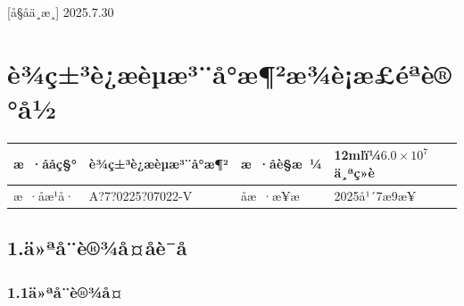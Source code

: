 \documentclass[UTF8,10pt,a4paper,fontset=fandol]{ctexart}
\newcommand{\fieldvalue}[1]{#1}
\newcommand{\handwritten}[1]{#1}
\begin{document}
\bigskip

\handwritten{[å§åä¸æ¸]}\quad
\handwritten{2025.7.30}

\newpage

\section*{è¾ç±³è¿æèµæ³¨å°æ¶²æ¾è¡æ£éªè®°å½}

\begin{tabularx}{\textwidth}{|l|X|l|X|}
\hline
æ ·ååç§° &
\fieldvalue{è¾ç±³è¿æèµæ³¨å°æ¶²} &
æ ·åè§æ ¼ &
\fieldvalue{12mlï¼$6.0\times10^{7}$ä¸ªç»è}
\\ \hline
æ ·åæ¹å· &
\fieldvalue{\handwritten{A?7?0225?07022-V}} &
åæ ·æ¥æ &
\fieldvalue{\handwritten{2025å¹´7æ9æ¥}}
\\ \hline
\end{tabularx}

\subsection*{1.\quad ä»ªå¨è®¾å¤åè¯å}

\subsubsection*{1.1\quad ä»ªå¨è®¾å¤}
\end{document}
